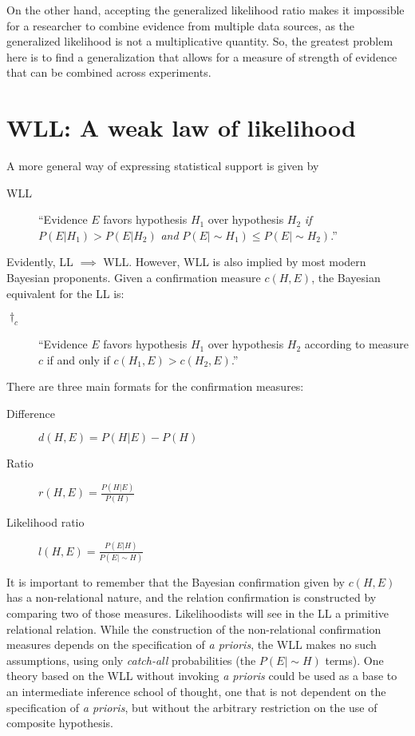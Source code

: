 \documentclass[twoside,12pt,a4paper]{article}
\begin{document}
On the other hand, accepting the generalized likelihood ratio makes it impossible for a researcher
to combine evidence from multiple data sources, as the generalized likelihood is not a multiplicative
quantity. So, the greatest problem here is to find a generalization that allows for a measure of
strength of evidence that can be combined across experiments.

\section{WLL: A weak law of likelihood}

A more general way of expressing statistical support is given by 

\begin{description}
\item[WLL]
``Evidence $E$ favors hypothesis $H_1$ over hypothesis $H_2$ {\em if} $P(E|H_1) > P(E|H_2)$ {\em and}
$P(E|\sim\!\!H_1) \leq P(E|\sim\!\!H_2)$.''
\citep{Fitelson07}
\end{description}

Evidently, LL $\implies$ WLL. However, WLL is also implied by most modern Bayesian proponents. Given a 
confirmation measure $c(H,E)$, the Bayesian equivalent for the LL is:

\begin{description}
\item[$\dagger_c$]
``Evidence $E$ favors hypothesis $H_1$ over hypothesis $H_2$ according to measure $c$ if and only if
  $c(H_1,E) > c(H_2,E)$.''
\citep{Fitelson07}
\end{description}

There are three main formats for the confirmation measures:
\begin{description}
\item[Difference] $d(H,E) = P(H|E)-P(H)$
\item[Ratio] $r(H,E) = \frac{P(H|E)}{P(H)}$
\item[Likelihood ratio] $l(H,E) = \frac{P(E|H)}{P(E|\sim\!\!H)}$
\end{description}

It is important to remember that the Bayesian confirmation given by $c(H,E)$ has a non-relational nature,
and the relation confirmation is constructed by comparing two of those measures. Likelihoodists will see
in the LL a primitive relational relation. While the construction of the non-relational confirmation measures
depends on the specification of {\em a prioris}, the WLL makes no such assumptions, using only {\em catch-all}
probabilities (the $P(E|\sim\!\!H)$ terms). One theory based on the WLL without invoking {\em a prioris}
could be used as a base to an intermediate inference school of thought, one that is not dependent on the
specification of {\em a prioris}, but without the arbitrary restriction on the use of composite hypothesis.
\end{document}
